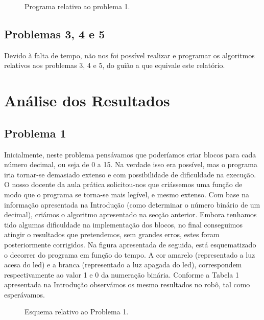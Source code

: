 \documentclass[a4paper, 12pt, onecolumn, oneside]{report}
\begin{document}
\begin{figure}[H]
\center{\texttt{[image: 2]}}
\caption{Programa relativo ao problema 1.}
\label{fig:speciation}
\end{figure}



\subsection{Problemas 3, 4 e 5}

Devido à falta de tempo, não nos foi possível realizar e programar os algoritmos relativos aos problemas 3, 4 e 5, do guião a que equivale este relatório.

\newpage
\section{Análise dos Resultados}


\subsection{Problema 1}

Inicialmente, neste problema pensávamos que poderíamos criar blocos para cada número decimal, ou seja de 0 a 15. Na verdade isso era possível, mas o programa iria tornar-se demasiado extenso e com possibilidade de dificuldade na execução. O nosso docente da aula prática solicitou-nos que criássemos uma função de modo que o programa se torna-se mais legível, e mesmo extenso. Com base na informação apresentada na Introdução (como determinar o número binário de um decimal), criámos o algoritmo apresentado na secção anterior. Embora tenhamos tido algumas dificuldade na implementação dos blocos, no final conseguimos atingir o resultados que pretendemos, sem grandes erros, estes foram posteriormente corrigidos.
Na figura apresentada de seguida, está esquematizado o decorrer do programa em função do tempo. A cor amarelo (representado a luz acesa do led) e a branca (representado a luz apagada do led), correspondem respectivamente ao valor 1 e 0 da numeração binária. Conforme a Tabela 1 apresentada na Introdução observámos os mesmo resultados no robô, tal como esperávamos.



\begin{figure}[H]
\caption{Esquema relativo ao Problema 1.}
\label{fig:speciation}
\end{figure}
\end{document}
